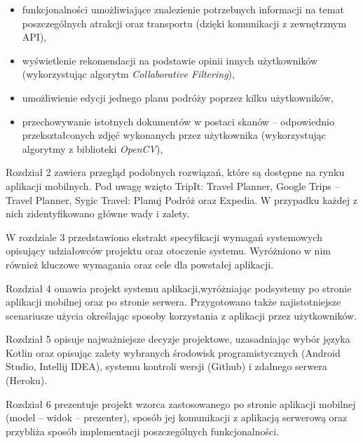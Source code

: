 \begin{itemize}

\item funkcjonalności umożliwiające znalezienie potrzebnych informacji na temat poszczególnych atrakcji oraz transportu (dzięki komunikacji z zewnętrznym API),

\item  wyświetlenie rekomendacji na podstawie opinii innych użytkowników (wykorzystując algorytm \textit{Collaborative Filtering}),

\item umożliwienie edycji jednego planu podróży poprzez kilku użytkowników,

\item przechowywanie istotnych dokumentów w postaci skanów – odpowiednio przekształconych zdjęć wykonanych przez użytkownika (wykorzystując algorytmy z biblioteki \textit{OpenCV}),

\end{itemize}

\par Rozdział 2 zawiera przegląd podobnych rozwiązań, które są dostępne na rynku aplikacji mobilnych. Pod uwagę wzięto TripIt: Travel Planner, Google Trips -- Travel Planner, Sygic Travel: Planuj Podróż oraz Expedia. W przypadku każdej z nich zidentyfikowano główne wady i zalety.

\par W rozdziale 3 przedstawiono ekstrakt specyfikacji wymagań systemowych opisujący udziałowców projektu oraz otoczenie systemu. Wyróżniono w nim również kluczowe wymagania oraz cele dla powstałej aplikacji.

\par Rozdział 4 omawia projekt systemu aplikacji,wyróżniając podsystemy po stronie aplikacji mobilnej oraz po stronie serwera. Przygotowano także najistotniejsze scenariusze użycia określając sposoby korzystania z aplikacji przez użytkowników.

\par Rozdział 5 opisuje najważniejsze decyzje projektowe, uzasadniając wybór języka Kotlin oraz opisując zalety wybranych środowisk programistycznych (Android Studio, Intellij IDEA), systemu kontroli wersji (Github) i zdalnego serwera (Heroku). 

\par Rozdział 6 prezentuje projekt wzorca zastosowanego po stronie aplikacji mobilnej (model -- widok -- prezenter), sposób jej komunikacji z aplikacją serwerową oraz przybliża sposób implementacji poszczególnych funkcjonalności.

